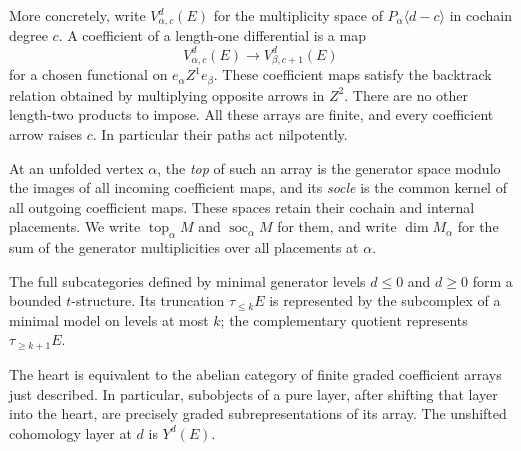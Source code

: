 More concretely, write $V^d_{\alpha,c}(E)$ for the multiplicity space
of $P_\alpha\langle d-c\rangle$ in cochain degree $c$.  A coefficient
of a length-one differential is a map
\[
 V^d_{\alpha,c}(E)\longrightarrow V^d_{\beta,c+1}(E)
\]
for a chosen functional on $e_\alpha Z^1e_\beta$.  These coefficient
maps satisfy the backtrack relation obtained by multiplying opposite
arrows in $Z^2$.  There are no other length-two products to impose.
All these arrays are finite, and every coefficient arrow raises $c$.
In particular their paths act nilpotently.

At an unfolded vertex $\alpha$, the \emph{top} of such an array is
the generator space modulo the images of all incoming coefficient
maps, and its \emph{socle} is the common kernel of all outgoing
coefficient maps.  These spaces retain their cochain and internal
placements.  We write $\operatorname{top}_\alpha M$ and
$\operatorname{soc}_\alpha M$ for them, and write
$\dim M_\alpha$ for the sum of the generator multiplicities over
all placements at $\alpha$.

\begin{lemma}\label{lem:layer-structure}
The full subcategories defined by minimal generator levels $d\leq0$
and $d\geq0$ form a bounded $t$-structure.  Its truncation
$\tau_{\leq k}E$ is represented by the subcomplex of a minimal model
on levels at most $k$; the complementary quotient represents
$\tau_{\geq k+1}E$.

The heart is equivalent to the abelian category of finite graded
coefficient arrays just described.  In particular, subobjects of a
pure layer, after shifting that layer into the heart, are precisely
graded subrepresentations of its array.  The unshifted cohomology
layer at $d$ is $Y^d(E)$.
\end{lemma}

